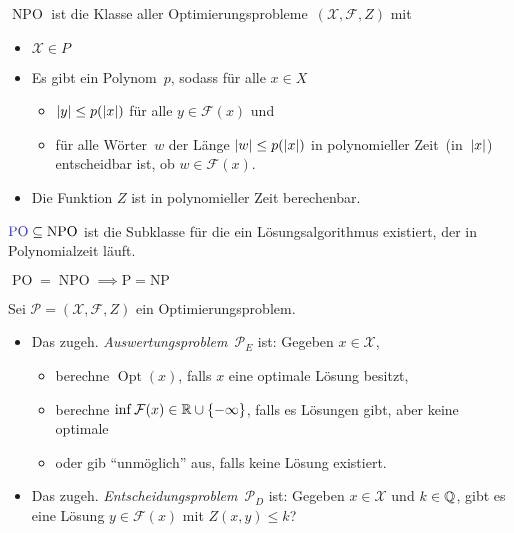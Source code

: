 \documentclass{cheat-sheet}
\newcommand{\Instances}{\mathcal{X}} %
\newcommand{\Feasible}{\mathcal{F}} %
\newcommand{\ObjFun}{Z} %
\newcommand{\OptTuple}{(\Instances{}, \Feasible{}, \ObjFun{})} %
\DeclareMathOperator{\Opt}{Opt} %
\newcommand{\size}[1]{\abs{#1}} %
\DeclareMathOperator{\NPO}{NPO} %
\DeclareMathOperator{\PO}{PO} %
\newcommand{\Prob}{\mathcal{P}} %
\begin{document}
\begin{defn}
  \emph{$\NPO$} ist die Klasse aller Optimierungsprobleme~$\OptTuple$ mit
  \begin{itemize}
    \item $\Instances{} \in P$
    \item Es gibt ein Polynom~$p$, sodass für alle $x \in X$
    \begin{itemize}
      \item $\size{y} \leq p(\size{x})$ für alle $y \in \Feasible(x)$ und
      \item für alle Wörter~$w$ der Länge $\size{w} \leq p(\size{x})$ in polynomieller Zeit~(in~$\size{x}$) entscheidbar ist, ob $w \in \Feasible(x)$.
    \end{itemize}
    \item Die Funktion $\ObjFun$ ist in polynomieller Zeit berechenbar.
  \end{itemize}
\end{defn}

\begin{defn}
  $\text{\emph{$\PO$}} \subseteq \NPO$ ist die Subklasse für die ein Lösungsalgorithmus existiert, der in Polynomialzeit läuft.
\end{defn}

\begin{beob}
  $\PO = \NPO \implies \text{P} = \text{NP}$
\end{beob}


\begin{defn}
  Sei $\Prob = \OptTuple$ ein Optimierungsproblem.
  \begin{itemize}
    \item Das zugeh. \emph{Auswertungsproblem}~$\Prob_E$ ist: Gegeben $x \in \Instances$,
    \begin{itemize}
      \item berechne $\Opt(x)$, falls $x$ eine optimale Lösung besitzt,
      \item berechne $\inf \Feasible(x) \in \R \cup \{ -\infty \}$, falls es Lösungen gibt, aber keine optimale
      \item oder gib "`unmöglich"' aus, falls keine Lösung existiert.
    \end{itemize}
    \item Das zugeh. \emph{Entscheidungsproblem}~$\Prob_D$ ist: Gegeben $x \in \Instances$ und $k \in \mathbb{Q}$, gibt es eine Lösung $y \in \Feasible(x)$ mit $Z(x, y) \leq k$?
  \end{itemize}
\end{defn}
\end{document}

